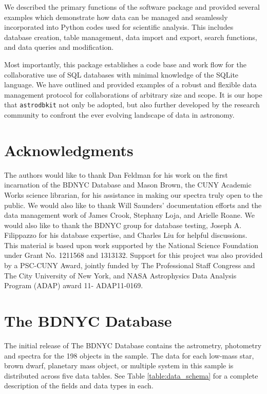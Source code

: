 \documentclass[iop,revtex4,natbib209]{emulateapj}
\begin{document}
We described the primary functions of the software package and provided several examples which demonstrate how data can be managed and seamlessly incorporated into Python codes used for scientific analysis. This includes database creation, table management, data import and export, search functions, and data queries and modification.

Most importantly, this package establishes a code base and work flow for the collaborative use of SQL databases with minimal knowledge of the SQLite language. We have outlined and provided examples of a robust and flexible data management protocol for collaborations of arbitrary size and scope. It is our hope that \texttt{astrodbkit} not only be adopted, but also further developed by the research community to confront the ever evolving landscape of data in astronomy.

\section*{Acknowledgments}
The authors would like to thank Dan Feldman for his work on the first incarnation of the BDNYC Database and Mason Brown, the CUNY Academic Works science librarian, for his assistance in making our spectra truly open to the public. We would also like to thank Will Saunders' documentation efforts and the data management work of James Crook, Stephany Loja, and Arielle Roane. We would also like to thank the BDNYC group for database testing, Joseph A. Filippazzo for his database expertise, and Charles Liu for helpful discussions. This material is based upon work supported by the National Science Foundation under Grant No. 1211568 and 1313132. Support for this project was also provided by a PSC-CUNY Award, jointly funded by The Professional Staff Congress and The City University of New York, and NASA Astrophysics Data Analysis Program (ADAP) award 11- ADAP11-0169.

\appendix

\section{The BDNYC Database}{\label{sec:appendix}}
The initial release of The BDNYC Database contains the astrometry, photometry and spectra for the 198 objects in the \citet{Fili15} sample. The data for each low-mass star, brown dwarf, planetary mass object, or multiple system in this sample is distributed across five data tables. See Table \ref{table:data_schema} for a complete description of the fields and data types in each. 
\end{document}

